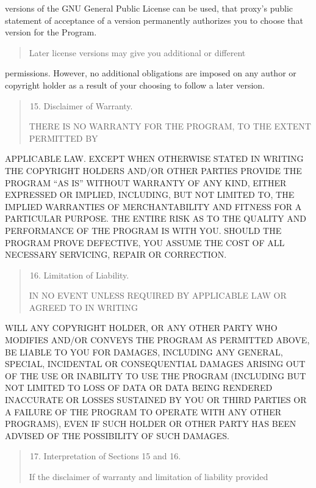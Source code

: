 \documentclass[letterpaper,10pt,english]{sphinxmanual}
\begin{document}
versions of the GNU General Public License can be used, that proxy’s
public statement of acceptance of a version permanently authorizes you
to choose that version for the Program.
\begin{quote}

Later license versions may give you additional or different
\end{quote}

permissions.  However, no additional obligations are imposed on any
author or copyright holder as a result of your choosing to follow a
later version.
\begin{quote}
\begin{enumerate}
\setcounter{enumi}{14}
\item {} 
Disclaimer of Warranty.

\end{enumerate}

THERE IS NO WARRANTY FOR THE PROGRAM, TO THE EXTENT PERMITTED BY
\end{quote}

APPLICABLE LAW.  EXCEPT WHEN OTHERWISE STATED IN WRITING THE COPYRIGHT
HOLDERS AND/OR OTHER PARTIES PROVIDE THE PROGRAM “AS IS” WITHOUT WARRANTY
OF ANY KIND, EITHER EXPRESSED OR IMPLIED, INCLUDING, BUT NOT LIMITED TO,
THE IMPLIED WARRANTIES OF MERCHANTABILITY AND FITNESS FOR A PARTICULAR
PURPOSE.  THE ENTIRE RISK AS TO THE QUALITY AND PERFORMANCE OF THE PROGRAM
IS WITH YOU.  SHOULD THE PROGRAM PROVE DEFECTIVE, YOU ASSUME THE COST OF
ALL NECESSARY SERVICING, REPAIR OR CORRECTION.
\begin{quote}
\begin{enumerate}
\setcounter{enumi}{15}
\item {} 
Limitation of Liability.

\end{enumerate}

IN NO EVENT UNLESS REQUIRED BY APPLICABLE LAW OR AGREED TO IN WRITING
\end{quote}

WILL ANY COPYRIGHT HOLDER, OR ANY OTHER PARTY WHO MODIFIES AND/OR CONVEYS
THE PROGRAM AS PERMITTED ABOVE, BE LIABLE TO YOU FOR DAMAGES, INCLUDING ANY
GENERAL, SPECIAL, INCIDENTAL OR CONSEQUENTIAL DAMAGES ARISING OUT OF THE
USE OR INABILITY TO USE THE PROGRAM (INCLUDING BUT NOT LIMITED TO LOSS OF
DATA OR DATA BEING RENDERED INACCURATE OR LOSSES SUSTAINED BY YOU OR THIRD
PARTIES OR A FAILURE OF THE PROGRAM TO OPERATE WITH ANY OTHER PROGRAMS),
EVEN IF SUCH HOLDER OR OTHER PARTY HAS BEEN ADVISED OF THE POSSIBILITY OF
SUCH DAMAGES.
\begin{quote}
\begin{enumerate}
\setcounter{enumi}{16}
\item {} 
Interpretation of Sections 15 and 16.

\end{enumerate}

If the disclaimer of warranty and limitation of liability provided
\end{quote}
\end{document}
